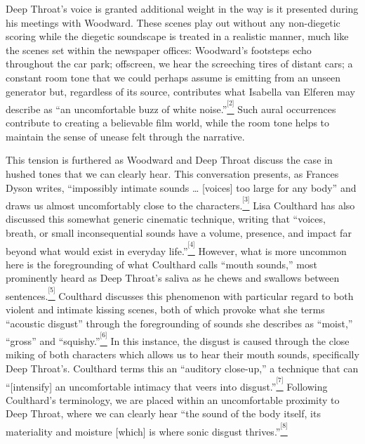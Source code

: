 Deep Throat’s voice is granted additional weight in the way is it presented during his meetings with Woodward.
These scenes play out without any non-diegetic scoring while the diegetic soundscape is treated in a realistic manner, much like the scenes set within the newspaper offices:
Woodward’s footsteps echo throughout the car park;
offscreen, we hear the screeching tires of distant cars;
a constant room tone that we could perhaps assume is emitting from an unseen generator but, regardless of its source, contributes what Isabella van Elferen may describe as “an uncomfortable buzz of white noise.”\href{applewebdata://3A1D666A-D52A-46D2-8C90-343A1EE58F85\#_ftn2}{\textsuperscript{\textsuperscript{[2]}}}
Such aural occurrences contribute to creating a believable film world, while the room tone helps to maintain the sense of unease felt through the narrative.

This tension is furthered as Woodward and Deep Throat discuss the case in hushed tones that we can clearly hear.
This conversation presents, as Frances Dyson writes, “impossibly intimate sounds … [voices] too large for any body” and draws us almost uncomfortably close to the characters.\href{applewebdata://3A1D666A-D52A-46D2-8C90-343A1EE58F85\#_ftn3}{\textsuperscript{\textsuperscript{[3]}}}
Lisa Coulthard has also discussed this somewhat generic cinematic technique, writing that “voices, breath, or small inconsequential sounds have a volume, presence, and impact far beyond what would exist in everyday life.”\href{applewebdata://3A1D666A-D52A-46D2-8C90-343A1EE58F85\#_ftn4}{\textsuperscript{\textsuperscript{[4]}}}
However, what is more uncommon here is the foregrounding of what Coulthard calls “mouth sounds,” most prominently heard as Deep Throat’s saliva as he chews and swallows between sentences.\href{applewebdata://3A1D666A-D52A-46D2-8C90-343A1EE58F85\#_ftn5}{\textsuperscript{\textsuperscript{[5]}}}
Coulthard discusses this phenomenon with particular regard to both violent and intimate kissing scenes, both of which provoke what she terms “acoustic disgust” through the foregrounding of sounds she describes as “moist,” “gross” and “squishy.”\href{applewebdata://3A1D666A-D52A-46D2-8C90-343A1EE58F85\#_ftn6}{\textsuperscript{\textsuperscript{[6]}}}
In this instance, the disgust is caused through the close miking of both characters which allows us to hear their mouth sounds, specifically Deep Throat’s. Coulthard terms this an “auditory close-up,” a technique that can “[intensify] an uncomfortable intimacy that veers into disgust.”\href{applewebdata://3A1D666A-D52A-46D2-8C90-343A1EE58F85\#_ftn7}{\textsuperscript{\textsuperscript{[7]}}}
Following Coulthard’s terminology, we are placed within an uncomfortable proximity to Deep Throat, where we can clearly hear “the sound of the body itself, its materiality and moisture [which] is where sonic disgust thrives.”\href{applewebdata://3A1D666A-D52A-46D2-8C90-343A1EE58F85\#_ftn8}{\textsuperscript{\textsuperscript{[8]}}}


